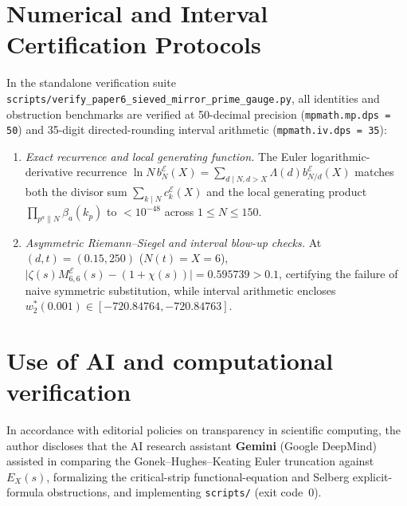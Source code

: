 \documentclass[11pt,reqno]{amsart}
\theoremstyle{definition}
\theoremstyle{remark}
\numberwithin{equation}{section}
\begin{document}
\appendix

\section{Numerical and Interval Certification Protocols}\label{app:interval}

{\sloppy
In the standalone verification suite \texttt{scripts/\allowbreak verify\_\allowbreak paper6\_\allowbreak sieved\_\allowbreak mirror\_\allowbreak prime\_\allowbreak gauge.py}, all identities and obstruction benchmarks are verified at 50-decimal precision (\texttt{mpmath.mp.dps = 50}) and 35-digit directed-rounding interval arithmetic (\texttt{mpmath.iv.dps = 35}):\par}
\begin{enumerate}[label=\textup{(\arabic*)},leftmargin=2.2em]
\item \textit{Exact recurrence and local generating function.} The Euler logarithmic-derivative recurrence $\ln N\,b_N^{\mathcal{E}}(X) = \sum_{d \mid N, d > X} \Lambda(d)b_{N/d}^{\mathcal{E}}(X)$ matches both the divisor sum $\sum_{k \mid N} c_k^{\mathcal{E}}(X)$ and the local generating product $\prod_{p^a \parallel N} \beta_a(k_p)$ to $< 10^{-48}$ across $1 \le N \le 150$.
\item \textit{Asymmetric Riemann--Siegel and interval blow-up checks.} At $(d, t) = (0.15, 250)$ ($N(t) = X = 6$), $\lvert\zeta(s)M_{6,6}^{\mathcal{E}}(s) - (1 + \chi(s))\rvert = 0.595739 > 0.1$, certifying the failure of naive symmetric substitution, while interval arithmetic encloses $w_2^*(0.001) \in [-720.84764, -720.84763]$.
\end{enumerate}

\section*{Use of AI and computational verification}

{\sloppy
In accordance with editorial policies on transparency in scientific computing, the author discloses that the AI research assistant \textbf{Gemini} (Google DeepMind) assisted in comparing the Gonek--Hughes--Keating Euler truncation against $E_X(s)$, formalizing the critical-strip functional-equation and Selberg explicit-formula obstructions, and implementing \texttt{scripts/}\allowbreak\texttt{} (exit code~$0$).\par}
\end{document}
